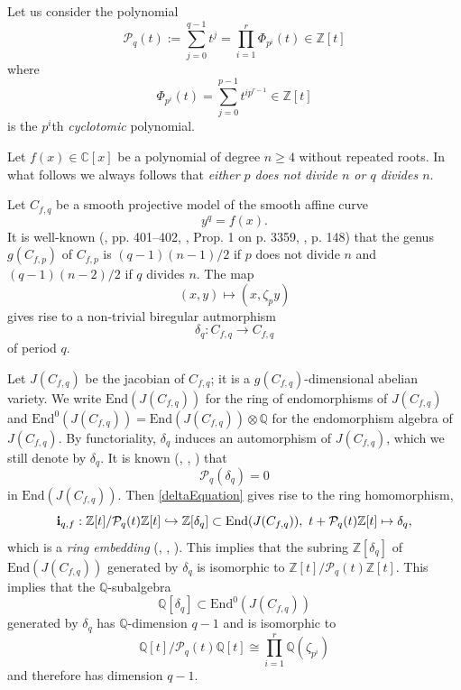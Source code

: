 \documentclass[12pt,a4paper,reqno]{amsart}
\def\Q{{\mathbb Q}}
\def\Z{{\mathbb Z}}
\def\C{{\mathbb C}}
\def\End{\mathrm{End}}
\theoremstyle{definition}
\begin{document}
Let us consider the polynomial
$$\mathcal{P}_q(t):=\sum_{j=0}^{q-1} t^j =\prod_{i=1}^r \Phi_{p^i}(t)\in \Z[t]$$
where 
$$\Phi_{p^i}(t)=\sum_{j=0}^{p-1} t^{i p^{r-1}}\in \Z[t]$$
is the $p^i$th {\sl cyclotomic} polynomial.






Let $f(x) \in \C[x]$ be a polynomial of degree $n\ge 4$ without repeated roots.  In what follows we always follows that {\sl either  $p$ does not divide $n$ or $q$ divides $n$}.



Let $C_{f,q}$ be a smooth projective model of the smooth affine curve
$$y^q=f(x).$$
It is well-known
(\cite{Koo}, pp. 401--402, \cite{Towse}, Prop. 1 on p. 3359,
 \cite{Poonen}, p. 148)
that the genus $g(C_{f,p})$  of $C_{f,p}$ is $(q-1)(n-1)/2$ if $p$ does not divide $n$ and $(q-1)(n-2)/2$ if $q$ divides $n$.
The map
 $$(x,y) \mapsto (x, \zeta_p y)$$
gives rise to a non-trivial biregular autmorphism
$$\delta_q: C_{f,q} \to C_{f,q}$$
of period $q$.

Let $J(C_{f,q})$  be the jacobian of $C_{f,q}$;
it is a $g(C_{f,q})$-dimensional abelian variety.
We write $\End(J(C_{f,q}))$ for the ring of endomorphisms of $J(C_{f,q})$ and
$\End^0(J(C_{f,q}))=\End(J(C_{f,q}))\otimes\Q$ for the endomorphism algebra of $J(C_{f,q})$.
By functoriality,
$\delta_q$ induces an automorphism of $J(C_{f,q})$,
which we still denote by $\delta_q$.  It is known (\cite[p. 149]{Poonen}, \cite[p. 448]{SPoonen}, 
\cite[Lemma 4.8]{ZarhinM}) that
\begin{equation}
\label{deltaEquation}
 \mathcal{P}_q(\delta_q)=0
\end{equation}
in $\End(J(C_{f,q}))$. 
Then \eqref{deltaEquation} gives rise to the  ring homomorphism,
\begin{equation}
\label{embedQ}
{\bf i}_{q,f}: \Z[t]/\mathcal{P}_q(t)\Z[t] \hookrightarrow \Z[\delta_q] \subset \End(J(C_{f,q})), \ t+\mathcal{P}_q(t)\Z[t]  \mapsto \delta_q,
\end{equation}
which is a {\sl ring embedding} (\cite[p. 149]{Poonen}, \cite[p. 448]{SPoonen}, 
\cite[Lemma 4.8]{ZarhinM}). This implies  that the subring $\Z[\delta_q]$ of $\End(J(C_{f,q}))$ generated by $\delta_q$
is isomorphic to $\Z[t]/\mathcal{P}_q(t)\Z[t]$. This implies that  the  $\Q$-subalgebra 
\begin{equation}
\label{Qdeltaq}
\Q[\delta_q] \subset\End^0(J(C_{f,q}))
\end{equation}
 generated by $\delta_q$ has $\Q$-dimension $q-1$ and 
is isomorphic to 
$$\Q[t]/\mathcal{P}_q(t)\Q[t]\cong \prod_{i=1}^r \Q(\zeta_{p^i})$$
and therefore has dimension $q-1$.
 
\end{document}
